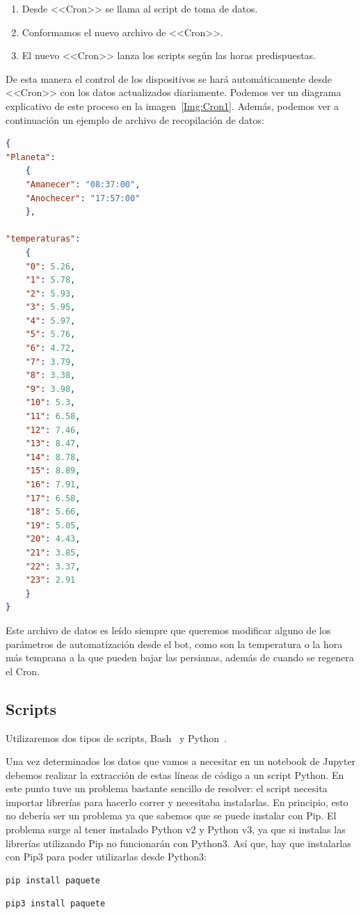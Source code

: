 \begin{enumerate}
    \item Desde <<Cron>> se llama al script de toma de datos.
    \item Conformamos el nuevo archivo de <<Cron>>.
    \item El nuevo <<Cron>> lanza los scripts según las horas predispuestas.
\end{enumerate}

De esta manera el control de los dispositivos se hará automáticamente desde <<Cron>> con los datos actualizados diariamente. Podemos ver un diagrama explicativo de este proceso en la imagen~\ref{Img:Cron1}. Además, podemos ver a continuación un ejemplo de archivo de recopilación de datos:

\begin{lstlisting}[language=json, basicstyle=\small, caption={Ejemplo archivo de recopilado de datos.}]
{
"Planeta":
	{
	"Amanecer": "08:37:00",
	"Anochecer": "17:57:00"
	},

"temperaturas":
	{
	"0": 5.26,
	"1": 5.78,
	"2": 5.93,
	"3": 5.95,
	"4": 5.97,
	"5": 5.76,
	"6": 4.72,
	"7": 3.79,
	"8": 3.38,
	"9": 3.98,
	"10": 5.3,
	"11": 6.58,
	"12": 7.46,
	"13": 8.47,
	"14": 8.78,
	"15": 8.89,
	"16": 7.91,
	"17": 6.58,
	"18": 5.66,
	"19": 5.05,
	"20": 4.43,
	"21": 3.85,
	"22": 3.37,
	"23": 2.91
	}
}
\end{lstlisting}


Este archivo de datos es leído siempre que queremos modificar alguno de los parámetros de automatización desde el bot, como son la temperatura o la hora más temprana a la que pueden bajar las persianas, además de cuando se regenera el Cron.

\subsection{Scripts}
Utilizaremos dos tipos de scripts, Bash~\cite{misc:Linux} y Python~\cite{misc:Python}.

Una vez determinados los datos que vamos a necesitar en un notebook de Jupyter debemos realizar la extracción de estas líneas de código a un script Python.
En este punto tuve un problema bastante sencillo de resolver: el script necesita importar librerías para hacerlo correr y necesitaba instalarlas. En principio, esto no debería ser un problema ya que sabemos que se puede instalar con Pip. El problema surge al tener instalado Python v2 y Python v3, ya que si instalas las librerías utilizando Pip no funcionarán con Python3. Así que, hay que instalarlas con Pip3 para poder utilizarlas desde Python3:
\begin{lstlisting}[language=cpp,firstnumber=0]
pip install paquete
\end{lstlisting}
\begin{lstlisting}[language=cpp,firstnumber=1]
pip3 install paquete
\end{lstlisting}

